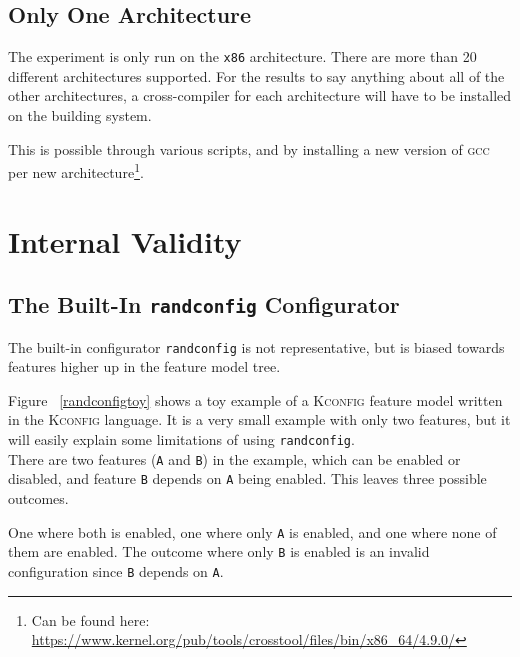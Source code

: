 \documentclass[a4paper,11pt]{report}
\newcommand{\f}{\footnote{\fn}}
\begin{document}
            \subsection{Only One Architecture}

The experiment is only run on the \texttt{x86} architecture. There are more than
20 different architectures supported. For the results to say anything about all 
of the other architectures, a cross-compiler for each architecture will have to
be installed on the building system.

            \def \fn {Can be found here: 
            \url{https://www.kernel.org/pub/tools/crosstool/files/bin/x86_64/4.9.0/}}

This is possible through various scripts, and by installing a new version of
\textsc{gcc} per new architecture\f.



            \section{Internal Validity}
            \label{sec:intval}

            \subsection{The Built-In \texttt{randconfig} Configurator}
            \label{sec:randconfbias}

The built-in configurator \texttt{randconfig} is not representative, but is 
biased towards features higher up in the feature model tree. 

Figure ~\ref{randconfigtoy} shows a toy example of a \textsc{Kconfig} feature 
model written in the \textsc{Kconfig} language.  It is a very small example 
with only two features, but it will easily explain some limitations of using 
\texttt{randconfig}.
\\

There are two features (\texttt{A} and \texttt{B}) in the example, which can be 
enabled or disabled, and feature \texttt{B} depends on \texttt{A} being enabled.
This leaves three possible outcomes. 

One where both is enabled, one where only \texttt{A} is enabled, and one where 
none of them are enabled. The outcome where only \texttt{B} is enabled is an 
invalid configuration since \texttt{B} depends on \texttt{A}.
\end{document}
